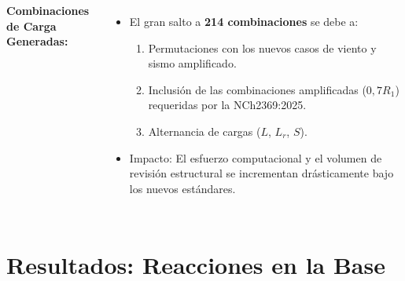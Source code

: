 \documentclass[11.5pt,aspectratio=169,handout]{beamer}
\begin{document}
\begin{frame}
\begin{columns}[T,totalwidth=\textwidth]
  \vspace{-1mm}
  {\footnotesize\textbf{Combinaciones de Carga Generadas:}}\\[2mm]
  \\[3mm]
  \begin{itemize}\scriptsize\setlength{\itemsep}{2mm}
    \item El gran salto a \textbf{214 combinaciones} se debe a:
    \begin{enumerate}\scriptsize
      \item Permutaciones con los nuevos casos de viento y sismo amplificado.
      \item Inclusión de las \alert{combinaciones amplificadas} ($0{,}7R_1$) requeridas por la NCh2369:2025.
      \item Alternancia de cargas ($L$, $L_r$, $S$).
    \end{enumerate}
    \item \alert{Impacto:} El esfuerzo computacional y el volumen de revisión estructural se incrementan drásticamente bajo los nuevos estándares.
  \end{itemize}
\end{columns}
\end{frame}

\section{Resultados: Reacciones en la Base}
\end{document}
